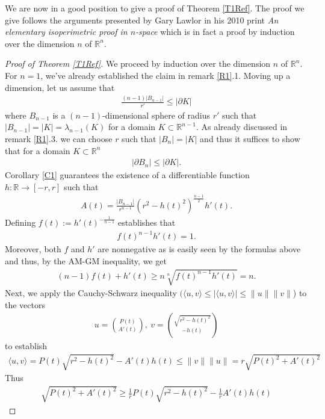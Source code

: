 \documentclass[12pt, a4paper, titlepage]{article}
\begin{document}
We are now in a good position to give a proof of Theorem \ref{T1Ref}. The proof we give follows the arguments presented by Gary Lawlor in his 2010 print \textit{An elementary isoperimetric proof in $n$-space} which is in fact a proof by induction over the dimension $n$ of $\mathbb{R}^n$. 
\begin{proof}[Proof of Theorem \ref{T1Ref}] We proceed by induction over the dimension $n$ of $\mathbb{R}^n$. For $n=1$, we've already established the claim in remark \ref{R1}.1. Moving up a dimension, let us assume that
\begin{align*}
\frac{(n-1)|B_{n-1}|}{r'} \leq | \partial K|
\end{align*}
where $B_{n-1}$ is a $(n-1)$-dimensional sphere of radius $r'$ such that $|B_{n-1}|=|K|= \lambda_{n-1}(K)$ for a domain $K \subset \mathbb{R}^{n-1}$. 
As already discussed in remark \ref{R1}.3. we can choose $r$ such that $|B_n|=|K|$ and thus it suffices to show that for a domain $K  \subset \mathbb{R}^n$
\begin{align*}
| \partial B_n| \leq | \partial K|.
\end{align*}
Corollary \ref{C1} guarantees the existence of a differentiable function $h: \mathbb{R} \to [-r,r]$ such that 
\begin{align*}
A(t) = \frac{|B_{n-1}|}{r^{n-1}} (r^2-h(t)^2)^\frac{n-1}{2} h'(t).
\end{align*}
Defining $f(t):= h'(t)^{-\frac{1}{n-1}}$ establishes that
\begin{align*}
f(t)^{n-1}h'(t)=1.
\end{align*}
Moreover, both $f$ and $h'$ are nonnegative as is easily seen by the formulas above and thus, by the AM-GM inequality, we get
\begin{align*}
(n-1)f(t)+h'(t) \geq n \sqrt[n]{f(t)^{n-1}h'(t)}=n.
\end{align*}
Next, we apply the Cauchy-Schwarz inequality $( \langle u ,v \rangle \leq | \langle u,v \rangle| \leq \|u\| \|v\|$) to the vectors
\begin{align*}
u = \binom{P(t)}{A'(t)}, \ v= \binom{ \sqrt{r^2-h(t)^2}}{-h(t)}
\end{align*}
to establish 
\begin{align*}
 \langle u, v \rangle= P(t) \sqrt{r^2-h(t)^2} - A'(t)h(t) \leq \|v\| \|u\| = r \sqrt{P(t)^2+A'(t)^2}
\end{align*}
\newpage
Thus 
\begin{align} \label{eq1}
\sqrt{P(t)^2 +A'(t)^2} \geq  \frac{1}{r}P(t)\sqrt{r^2-h(t)^2} - \frac{1}{r}A'(t)h(t) 

\end{align}
\end{proof}
\end{document}
